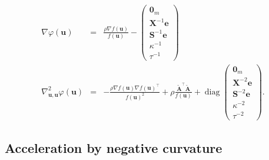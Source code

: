 \documentclass{article}
\newcommand{\tmop}[1]{\ensuremath{\operatorname{#1}}}
\newcommand{\A}{\mathbf{A}}
\newcommand{\0}{\textbf{0}}
\newcommand{\e}{\mathbf{e}}
\newcommand{\n}{\nabla}
\newcommand{\X}{\mathbf{X}}
\newcommand{\tmu}{\mathbf{u}}
\newcommand{\bs}{\mathbf{S}}
\begin{document}
\begin{eqnarray*}
  \nabla \varphi \left( \tmu \right) & = & \frac{\rho \n f \left( \tmu
  \right)}{f \left( \tmu \right)} - \left(\begin{array}{c}
    \0_m\\
    \X^{- 1} \e\\
    \bs^{- 1} \e\\
    \kappa^{- 1}\\
    \tau^{- 1}
  \end{array}\right)\\
  \nabla^2_{\tmu, \tmu} \varphi \left( \tmu \right) & = & - \frac{\rho \n f
  \left( \tmu \right) \n f \left( \tmu \right)^{\top}}{f \left( \tmu
  \right)^2} + \rho \frac{\widetilde{\A}^{\top} \widetilde{\A}}{f \left( \tmu
  \right)} + \tmop{diag} \left(\begin{array}{c}
    \0_m\\
    \X^{- 2} \e\\
    \bs^{- 2} \e\\
    \kappa^{- 2}\\
    \tau^{- 2}
  \end{array}\right) .
\end{eqnarray*}

\subsection{Acceleration by negative curvature}
\end{document}
